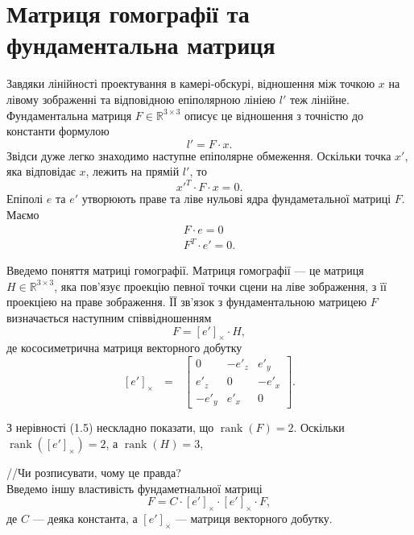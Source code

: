 \section{Матриця гомографії та фундаментальна матриця}
Завдяки лінійності проектування в камері-обскурі, відношення між точкою $x$ 
на лівому зображенні та відповідною епіполярною лініею $l'$ теж лінійне. 
Фундаментальна матриця $F \in \mathbb{R}^{3\times3}$ описує це відношення з
точністю до константи формулою
\begin{equation}
l' = F \cdot x.
\end{equation}
Звідси дуже легко знаходимо наступне епіполярне обмеження. Оскільки точка $x'$, 
яка відповідає $x$, лежить на прямій $l'$, то
\begin{equation}
{x'}^T \cdot F \cdot x = 0.
\end{equation}
Епіполі $e$ та $e'$ утворюють праве та ліве нульові ядра фундаметальної матриці 
$F$. Маємо 
\begin{gather}
F \cdot e = 0 
\\
F^T \cdot e' = 0.
\end{gather}

Введемо поняття матриці гомографії. Матриця гомографії --- це матриця 
$H \in \mathbb{R}^{3\times3}$, яка пов'язує проекцію певної точки сцени на ліве
зображення, з її проекціею на праве зображення. ЇЇ зв'язок з фундаментальною
матрицею $F$ визначається наступним співвідношенням \cite{LUONG1996193}
\begin{equation}
F = {[e']}_\times \cdot H,
\end{equation}
де кососиметрична матриця векторного добутку
\begin{equation}
{[e']}_\times \:\:\: = \:\:\:
\left[
\begin{matrix}
0 & -{e'}_z & {e'}_y\\
{e'}_z & 0 & -{e'}_x\\
-{e'}_y & {e'}_x & 0\
\end{matrix}
\right].
\end{equation}

З нерівності (1.5) нескладно показати, що $\operatorname{rank}(F) = 2$. Оскільки
$\operatorname{rank}({[e']}_\times) = 2$, а $\operatorname{rank}(H) = 3$,

//Чи розписувати, чому це правда?\\
Введемо іншу властивість фундаметнальної матриці 
\begin{equation}
F = C \cdot {[e']}_\times \cdot {[e']}_\times \cdot F,
\end{equation}
де $C$ --- деяка константа, а ${[e']}_\times$ --- матриця векторного добутку.

